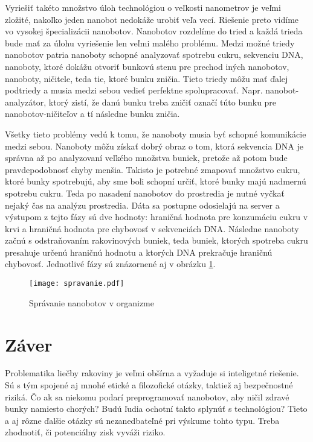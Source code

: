 \documentclass[10pt,twoside,slovak,a4paper]{article}
\begin{document}
Vyriešiť takéto množstvo úloh technológiou o veľkosti nanometrov je veľmi zložité, nakoľko jeden nanobot nedokáže urobiť veľa vecí. Riešenie preto vidíme vo vysokej špecializácii nanobotov. Nanobotov rozdelíme do tried a každá trieda bude mať za úlohu vyriešenie len veľmi malého problému. Medzi možné triedy nanobotov patria nanoboty schopné analyzovať spotrebu cukru, sekvenciu DNA, nanoboty, ktoré dokážu otvoriť bunkovú stenu pre prechod iných nanobotov, nanoboty, ničitele, teda tie, ktoré bunku zničia. Tieto triedy môžu mať ďalej podtriedy a musia medzi sebou vedieť perfektne spolupracovať. Napr. nanobot-analyzátor, ktorý zistí, že danú bunku treba zničiť označí túto bunku pre nanobotov-ničiteľov a tí následne bunku zničia.

Všetky tieto problémy vedú k tomu, že nanoboty musia byť schopné komunikácie medzi sebou. Nanoboty môžu získať dobrý obraz o tom, ktorá sekvencia DNA je správna až po analyzovaní veľkého množstva buniek, pretože až potom bude pravdepodobnosť chyby menšia. Takisto je potrebné zmapovať množstvo cukru, ktoré bunky spotrebujú, aby sme boli schopní určiť, ktoré bunky majú nadmernú spotrebu cukru. Teda po nasadení nanobotov do prostredia je nutné vyčkať nejaký čas na analýzu prostredia. Dáta sa postupne odosielajú na server a výstupom z tejto fázy sú dve hodnoty: hraničná hodnota pre konzumáciu cukru v krvi a hraničná hodnota pre chybovosť v sekvenciách DNA. Následne nanoboty začnú s odstraňovaním rakovinových buniek, teda buniek, ktorých spotreba cukru presahuje určenú hraničnú hodnotu a ktorých DNA prekračuje hraničnú chybovosť. Jednotlivé fázy sú znázornené aj v obrázku \ref{f:spravanie}.

\begin{figure}[tbh]
\label{f:spravanie}
\centering
\texttt{[image: spravanie.pdf]}
\caption{Správanie nanobotov v organizme}
\end{figure}
\section{Záver}

Problematika liečby rakoviny je veľmi obšírna a vyžaduje si inteligetné riešenie. Sú s tým spojené aj mnohé etické a filozofické otázky, taktiež aj bezpečnostné riziká. Čo ak sa niekomu podarí preprogramovať nanobotov, aby ničil zdravé bunky namiesto chorých? Budú ľudia ochotní takto splynúť s technológiou? Tieto a aj rôzne ďalšie otázky sú nezanedbateľné pri výskume tohto typu. Treba zhodnotiť, či potenciálny zisk vyváži riziko.

\listoffigures


\end{document}
